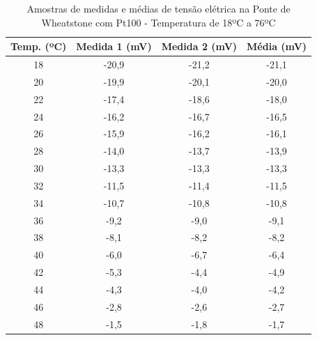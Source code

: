 \documentclass[a4paper]{instrumentacao}
\begin{document}
\begin{table}[H]
\centering
\caption{Amostras de medidas e médias de tensão elétrica na Ponte de Wheatstone com Pt100 - Temperatura de 18ºC a 76ºC}
\label{tab:amostras-ponte-pt100}
\begin{tabular}{|c|c|c|c|}
\hline
\textbf{Temp. (ºC)} & \textbf{Medida 1 (mV)} & \textbf{Medida 2 (mV)} & \textbf{Média (mV)} \\ \hline
18                  & -20,9                  & -21,2                  & -21,1               \\ \hline
20                  & -19,9                  & -20,1                  & -20,0               \\ \hline
22                  & -17,4                  & -18,6                  & -18,0               \\ \hline
24                  & -16,2                  & -16,7                  & -16,5               \\ \hline
26                  & -15,9                  & -16,2                  & -16,1               \\ \hline
28                  & -14,0                  & -13,7                  & -13,9               \\ \hline
30                  & -13,3                  & -13,3                  & -13,3               \\ \hline
32                  & -11,5                  & -11,4                  & -11,5               \\ \hline
34                  & -10,7                  & -10,8                  & -10,8               \\ \hline
36                  & -9,2                   & -9,0                   & -9,1                \\ \hline
38                  & -8,1                   & -8,2                   & -8,2                \\ \hline
40                  & -6,0                   & -6,7                   & -6,4                \\ \hline
42                  & -5,3                   & -4,4                   & -4,9                \\ \hline
44                  & -4,3                   & -4,0                   & -4,2                \\ \hline
46                  & -2,8                   & -2,6                   & -2,7                \\ \hline
48                  & -1,5                   & -1,8                   & -1,7                \\ \hline

\end{tabular}
\end{table}
\end{document}
